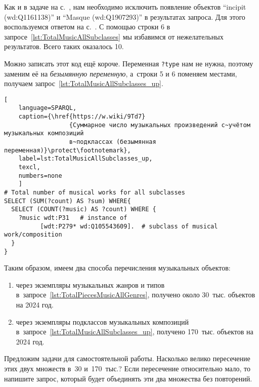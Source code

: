 Как и в задаче на с.~\pageref{question:music_comp}, нам необходимо исключить появление 
объектов ``incipit (wd:Q1161138)'' и ``Masque (wd:Q1907293)'' в результатах запроса. 
Для этого воспользуемся ответом на с.~\pageref{answer:music_in_each_subclas_filter}. 
С помощью строки 6 в запросе~\ref{lst:TotalMusicAllSubclasses} мы избавимся от нежелательных результатов. 
Всего таких оказалось 10. 

Можно записать этот код ещё короче. 
Переменная \lstinline|?type| нам не нужна, 
поэтому заменим её на \emph{безымянную переменную}, 
а~строки 5 и 6 поменяем местами, 
получаем запрос~\ref{lst:TotalMusicAllSubclasses_up}.


\newpage
\begin{lstlisting}[ 
    language=SPARQL,
    caption={\href{https://w.wiki/9Td7}
                  {Суммарное число музыкальных произведений с~учётом музыкальных композиций 
                  в~подклассах (безымянная переменная)}\protect\footnotemark},
    label=lst:TotalMusicAllSubclasses_up,
    texcl,
    numbers=none
    ]
# Total number of musical works for all subclasses
SELECT (SUM(?count) AS ?sum) WHERE{
  SELECT (COUNT(?music) AS ?count) WHERE {
    ?music wdt:P31   # instance of
          [wdt:P279* wd:Q105543609].  # subclass of musical work/composition
  }       
}
\end{lstlisting}%

Таким образом, имеем два способа перечисления музыкальных объектов: 
\begin{enumerate}
    \item через экземпляры музыкальных жанров и типов в~запросе~\ref{lst:TotalPiecesMusicAllGenres}, 
        получено около 30~тыс. объектов на 2024 год. 

    \item через экземпляры подклассов музыкальных композиций в~запросе~\ref{lst:TotalMusicAllSubclasses_up}, 
        получено 170~тыс. объектов на 2024 год.
\end{enumerate}

Предложим задачи для самостоятельной работы. 
Насколько велико пересечение этих двух множеств в~30 и~170~тыс.? 
Если пересечение относительно мало, то напишите запрос, 
который будет объединять эти два множества без повторений. 





